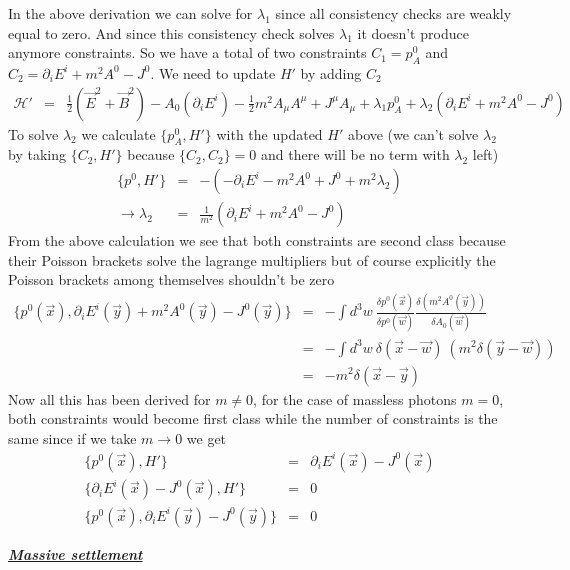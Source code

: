 \documentclass[aps,preprint,preprintnumbers,nofootinbib,showpacs,prd]{revtex4-1}
\newcommand{\nbea}{\begin{eqnarray*}}
\newcommand{\neea}{\end{eqnarray*}}
\begin{document}
In the above derivation we can solve for $\lambda_1$ since all consistency checks are weakly equal to zero. And since this consistency check solves $\lambda_1$ it doesn't produce anymore constraints. So we have a total of two constraints $C_1 = p^0_A$ and $C_2 = \partial_i E^{i} + m^2 A^0 - J^0$. We need to update $H'$ by adding $C_2$
%
\nbea
\mathcal{H}' & = & \frac{1}{2} \left ( \vec E^2 + \vec B^2 \right ) - A_0 (\partial_i E^{i}) - \frac{1}{2} m^2 A_\mu A^\mu + J^\mu A_\mu + \lambda_1 p^0_A + \lambda_2 (\partial_i E^{i} + m^2 A^0 - J^0)
\neea
%
To solve $\lambda_2$ we calculate $\{p^0_A, H'\}$ with the updated $H'$ above (we can't solve $\lambda_2$ by taking $\{C_2, H'\}$ because $\{C_2, C_2\} = 0$ and there will be no term with $\lambda_2$ left)
%
\nbea
\{p^0, H'\} & = & -(-\partial_i E^{i} - m^2 A^0 + J^0 + m^2 \lambda_2) \\
\to \lambda_2 & = & \frac{1}{m^2} (\partial_i E^{i} + m^2 A^0 - J^0)
\neea
%
From the above calculation we see that both constraints are second class because their Poisson brackets solve the lagrange multipliers but of course explicitly the Poisson brackets among themselves shouldn't be zero
%
\nbea
\{p^0(\vec x), \partial_i E^{i}(\vec y) + m^2 A^0(\vec y) - J^0(\vec y)\} & = & -\int d^3w~\frac{\delta p^0(\vec x)}{\delta p^0(\vec w)}\frac{\delta (m^2 A^0(\vec y))}{\delta A_0(\vec w)} \\
& = & -\int d^3w~\delta(\vec x - \vec w) ~(m^2 \delta(\vec y - \vec w)) \\
& = & -m^2 \delta(\vec x - \vec y)
\neea
%
Now all this has been derived for $m \neq 0$, for the case of massless photons $m=0$, both constraints would become first class while the number of constraints is the same since if we take $m \to 0$ we get
%
\nbea
\{p^0(\vec x), H'\} & = & \partial_i E^{i}(\vec x) - J^0(\vec x) \\
\{\partial_i E^{i}(\vec x) - J^0(\vec x), H'\} & = & 0 \\
\{p^0(\vec x), \partial_i E^{i}(\vec y) - J^0(\vec y)\} & = & 0
\neea
%

\bigskip
\underline{\textit{\textbf{Massive settlement}}}
\end{document}
